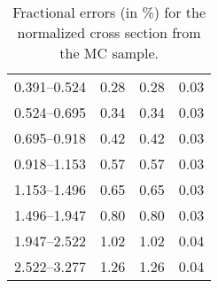 \begin{table}
\begin{center}
\begin{tabular}{@{}l l l l@{}}
            0.391--0.524 & 0.28 & 0.28 & 0.03  \\
            0.524--0.695 & 0.34 & 0.34 & 0.03  \\
            0.695--0.918 & 0.42 & 0.42 & 0.03  \\
            0.918--1.153 & 0.57 & 0.57 & 0.03  \\
            1.153--1.496 & 0.65 & 0.65 & 0.03  \\
            1.496--1.947 & 0.80 & 0.80 & 0.03  \\
            1.947--2.522 & 1.02 & 1.02 & 0.04  \\
            2.522--3.277 & 1.26 & 1.26 & 0.04  \\
            \bottomrule
        \end{tabular}
    \end{center}
    \caption{
        Fractional errors (in \%) for the normalized cross section from the
        \MADGRAPH MC sample.
    }
    \label{tab:madgraph_uncert_norm}
\end{table}
